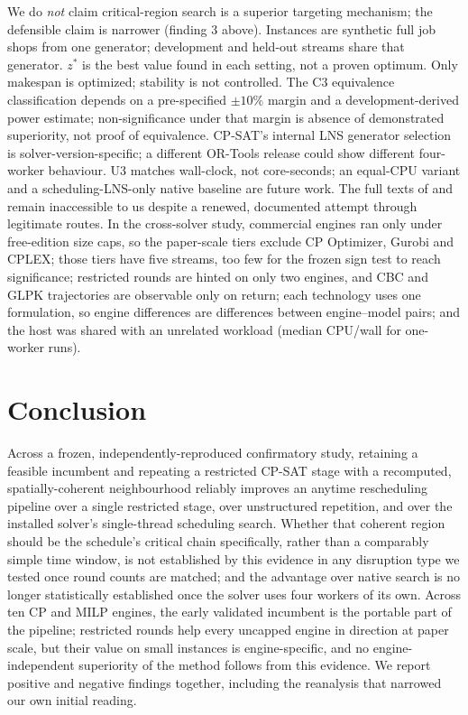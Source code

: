 \documentclass[letterpaper]{article} %
\begin{document}
We do \emph{not} claim critical-region search is a superior targeting mechanism; the defensible claim is narrower (finding 3 above). Instances are synthetic full job shops from one generator; development and held-out streams share that generator. $z^*$ is the best value found in each setting, not a proven optimum. Only makespan is optimized; stability is not controlled. The C3 equivalence classification depends on a pre-specified $\pm10\%$ margin and a development-derived power estimate; non-significance under that margin is absence of demonstrated superiority, not proof of equivalence. CP-SAT's internal LNS generator selection is solver-version-specific; a different OR-Tools release could show different four-worker behaviour. U3 matches wall-clock, not core-seconds; an equal-CPU variant and a scheduling-LNS-only native baseline are future work. The full texts of \citet{sun2026} and \citet{linyang2026} remain inaccessible to us despite a renewed, documented attempt through legitimate routes. In the cross-solver study, commercial engines ran only under free-edition size caps, so the paper-scale tiers exclude CP Optimizer, Gurobi and CPLEX; those tiers have five streams, too few for the frozen sign test to reach significance; restricted rounds are hinted on only two engines, and CBC and GLPK trajectories are observable only on return; each technology uses one formulation, so engine differences are differences between engine--model pairs; and the host was shared with an unrelated workload (median CPU/wall \MSCpuWall{} for one-worker runs).

\section{Conclusion}

Across a frozen, independently-reproduced confirmatory study, retaining a feasible incumbent and repeating a restricted CP-SAT stage with a recomputed, spatially-coherent neighbourhood reliably improves an anytime rescheduling pipeline over a single restricted stage, over unstructured repetition, and over the installed solver's single-thread scheduling search. Whether that coherent region should be the schedule's critical chain specifically, rather than a comparably simple time window, is not established by this evidence in any disruption type we tested once round counts are matched; and the advantage over native search is no longer statistically established once the solver uses four workers of its own. Across ten CP and MILP engines, the early validated incumbent is the portable part of the pipeline; restricted rounds help every uncapped engine in direction at paper scale, but their value on small instances is engine-specific, and no engine-independent superiority of the method follows from this evidence. We report positive and negative findings together, including the reanalysis that narrowed our own initial reading.


\end{document}
